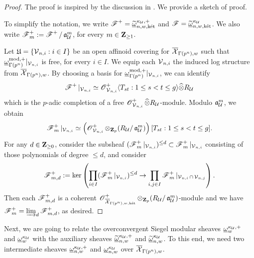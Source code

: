 \begin{proof}
The proof is inspired by the discussion in \cite[\S 8.1]{AIP-2015}. We provide a sketch of proof. 

To simplify the notation, we write $\scrF^+=\widetilde{\underline{\omega}}_{n, w, \ket}^{\kappa_{\calU}, +}$ and $\scrF=\widetilde{\underline{\omega}}_{n, w, \ket}^{\kappa_{\calU}}$. We also write $\scrF^+_m:=\scrF^+/\fraka_{\calU}^m$, for every $m\in \Z_{\geq 1}$.

Let $\mathfrak{U}=\{\calV_{n, i} : i\in I\}$ be an open affinoid covering for $\overline{\calX}_{\Gamma(p^n), w}$ such that $\underline{\omega}_{\Gamma(p^n)}^{\mathrm{mod}, +}|_{\calV_{n, i}}$ is free, for every $i\in I$. We equip each $\calV_{n,i}$ the induced log structure from $\overline{\calX}_{\Gamma(p^n), w}$. By choosing a basis for $\underline{\omega}_{\Gamma(p^n)}^{\mathrm{mod}, +}|_{\calV_{n, i}}$, we can identify \[
    \scrF^+|_{\calV_{n, i}} \simeq \scrO^+_{\calV_{n, i}}\langle T_{st}: 1\leq s<t\leq g\rangle \widehat{\otimes} R_{\calU}
\] 
which is the $p$-adic completion of a free $\scrO^+_{\calV_{n, i}} \widehat{\otimes} R_{\calU}$-module.
Modulo $\fraka_{\calU}^m$, we obtain
\[
\scrF^+_m|_{\calV_{n, i}} \simeq \left(\scrO^+_{\calV_{n, i}} \otimes_{\Z_p} (R_{\calU}/\fraka_{\calU}^m)\right)[T_{st}: 1\leq s<t\leq g].
\]
For any $d\in \Z_{\geq 0}$, consider the subsheaf $(\scrF^+_m|_{\calV_{n,i}})^{\leq d}\subset \scrF^+_m|_{\calV_{n,i}}$ consisting of those polynomials of degree $\leq d$, and consider
$$
\scrF^+_{m,d}:=\ker\left( \prod_{i\in I}(\scrF^+_m|_{\calV_{n,i}})^{\leq d}\rightarrow\prod_{i, j\in I} \scrF^+_m|_{\calV_{n,i}\cap \calV_{n,j}}\right).
$$
Then each $\scrF^+_{m,d}$ is a coherent $\scrO^+_{\overline{\calX}_{\Gamma(p^n), w, \ket}}\otimes_{\Z_p} (R_{\calU}/\fraka_{\calU}^m)$-module and we have $\scrF^+_m=\varinjlim_d \scrF^+_{m,d}$, as desired.
\end{proof}

Next, we are going to relate the overconvergent Siegel modular sheaves $\underline{\omega}^{\kappa_{\calU},+}_w$ and $\underline{\omega}^{\kappa_{\calU}}_w$ with the auxiliary sheaves $\widetilde{\underline{\omega}}^{\kappa_{\calU},+}_{n,w}$ and $\widetilde{\underline{\omega}}^{\kappa_{\calU}}_{n,w}$. To this end, we need two intermediate sheaves $\underline{\omega}_{n, w}^{\kappa_{\calU},+}$ and $\underline{\omega}_{n, w}^{\kappa_{\calU}}$ over $\overline{\calX}_{\Gamma(p^n),w}$.

